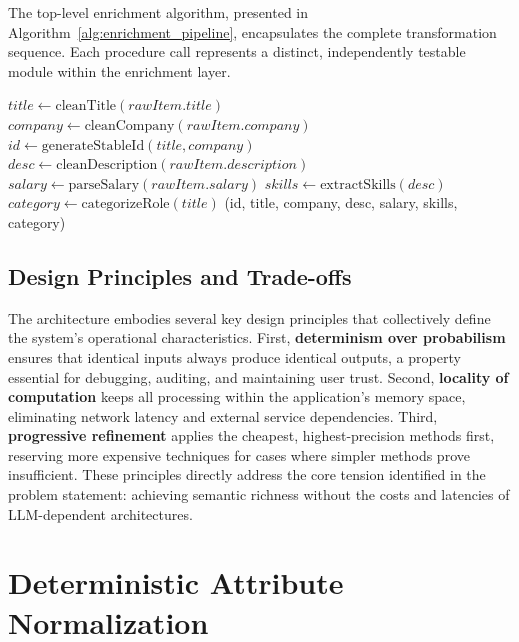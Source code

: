 The top-level enrichment algorithm, presented in Algorithm~\ref{alg:enrichment_pipeline}, encapsulates the complete transformation sequence. Each procedure call represents a distinct, independently testable module within the enrichment layer.

\begin{algorithm}[H]
\caption{Internship Ingestion and Enrichment Pipeline}
\label{alg:enrichment_pipeline}
\begin{algorithmic}[1]
    \State $title \gets \text{cleanTitle}(rawItem.title)$
    \State $company \gets \text{cleanCompany}(rawItem.company)$
    \State $id \gets \text{generateStableId}(title, company)$
    \State $desc \gets \text{cleanDescription}(rawItem.description)$
    \State $salary \gets \text{parseSalary}(rawItem.salary)$
    \State $skills \gets \text{extractSkills}(desc)$
    \State $category \gets \text{categorizeRole}(title)$
    \State \Return {}(id, title, company, desc, salary, skills, category)
\EndProcedure
\end{algorithmic}
\end{algorithm}

\subsection{Design Principles and Trade-offs}

The architecture embodies several key design principles that collectively define the system's operational characteristics. First, \textbf{determinism over probabilism} ensures that identical inputs always produce identical outputs, a property essential for debugging, auditing, and maintaining user trust. Second, \textbf{locality of computation} keeps all processing within the application's memory space, eliminating network latency and external service dependencies. Third, \textbf{progressive refinement} applies the cheapest, highest-precision methods first, reserving more expensive techniques for cases where simpler methods prove insufficient. These principles directly address the core tension identified in the problem statement: achieving semantic richness without the costs and latencies of LLM-dependent architectures.

\section{Deterministic Attribute Normalization}

